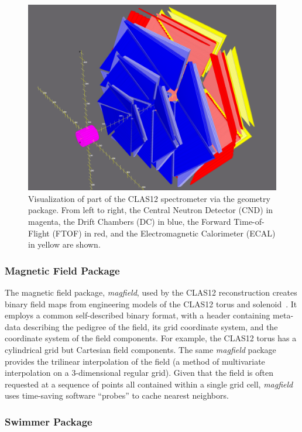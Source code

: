 \begin{figure}
\centering
\includegraphics[width=1.0\columnwidth]{pics/detectorview.png}
\caption{Visualization of part of the CLAS12 spectrometer via the geometry package. From left to right, the Central
  Neutron Detector (CND) in magenta, the Drift Chambers (DC) in blue, the Forward Time-of-Flight (FTOF) in red,
  and the Electromagnetic Calorimeter (ECAL) in yellow are shown.}
\label{fig:detectorview}
\end{figure}

\subsubsection{Magnetic Field Package}

The magnetic field package, {\it magfield}, used by the CLAS12 reconstruction creates binary field maps from
engineering models of the CLAS12 torus and solenoid~\cite{magnets-nim}. It employs a common self-described
binary format, with a header containing meta-data describing the pedigree of the field, its grid coordinate system,
and the coordinate system of the field components. For example, the CLAS12 torus has a cylindrical grid but
Cartesian field components. The same {\it magfield} package provides the trilinear interpolation of the field (a
method of multivariate interpolation on a 3-dimensional regular grid). Given that the field is often requested at a
sequence of points all contained within a single grid cell, {\it magfield} uses time-saving software “probes” to cache
nearest neighbors.

\subsubsection{Swimmer Package}

